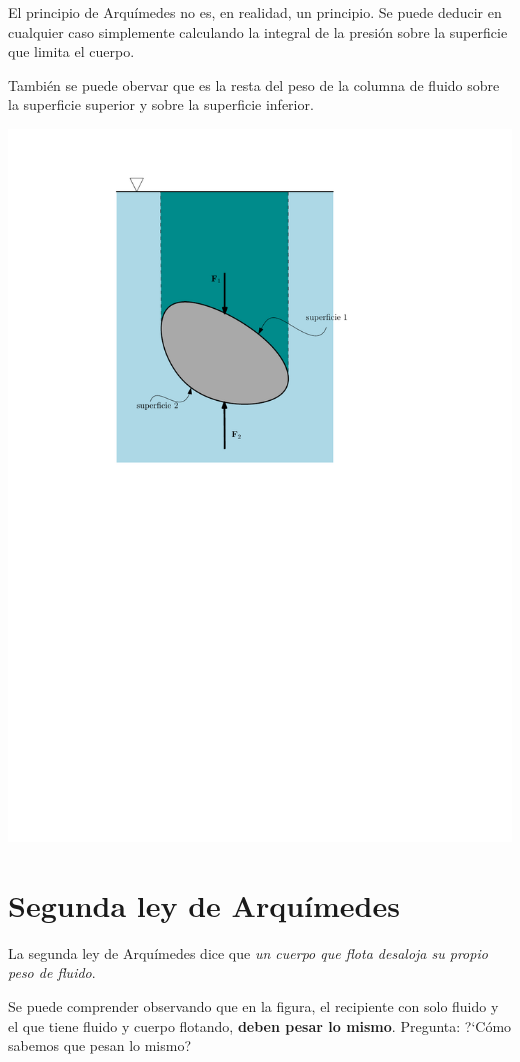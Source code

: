 	El principio de Arquímedes no es, en realidad, un principio. Se puede deducir en cualquier caso simplemente calculando la integral de la presión sobre la superficie que limita el cuerpo.
	
	También se puede obervar que es la resta del peso de la columna de fluido sobre la superficie superior y sobre la superficie inferior.
	
\begin{center}
	\includegraphics[width=0.5\columnwidth]{TeX_files/chapter02-Hidrostatica/arquimedes2}
\end{center}
\section{Segunda ley de Arquímedes}


	La segunda ley de Arqu\'imedes dice que \emph{un cuerpo que flota desaloja su propio peso de fluido}. 
	
	Se puede comprender observando que en la figura, el recipiente con solo fluido y el que tiene fluido y cuerpo flotando, \textbf{deben pesar lo mismo}. Pregunta: ?`C\'omo sabemos que pesan lo mismo?


